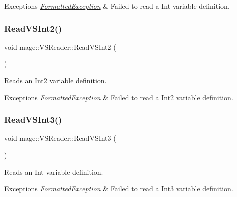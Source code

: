\begin{DoxyExceptions}{Exceptions}
{\em \hyperlink{structmage_1_1_formatted_exception}{Formatted\+Exception}} & Failed to read a Int variable definition. \\
\hline
\end{DoxyExceptions}
\hypertarget{classmage_1_1_v_s_reader_a4a3b90b47cb5e262a72df719674b9d93}{}\label{classmage_1_1_v_s_reader_a4a3b90b47cb5e262a72df719674b9d93} 
\subsubsection{\texorpdfstring{Read\+V\+S\+Int2()}{ReadVSInt2()}}
{\footnotesize\ttfamily void mage\+::\+V\+S\+Reader\+::\+Read\+V\+S\+Int2 (\begin{DoxyParamCaption}{ }\end{DoxyParamCaption})\hspace{0.3cm}{\ttfamily [private]}}

Reads an Int2 variable definition.


\begin{DoxyExceptions}{Exceptions}
{\em \hyperlink{structmage_1_1_formatted_exception}{Formatted\+Exception}} & Failed to read a Int2 variable definition. \\
\hline
\end{DoxyExceptions}
\hypertarget{classmage_1_1_v_s_reader_a6fa8fa2cbb66a9a1872bb84a0612a32d}{}\label{classmage_1_1_v_s_reader_a6fa8fa2cbb66a9a1872bb84a0612a32d} 
\subsubsection{\texorpdfstring{Read\+V\+S\+Int3()}{ReadVSInt3()}}
{\footnotesize\ttfamily void mage\+::\+V\+S\+Reader\+::\+Read\+V\+S\+Int3 (\begin{DoxyParamCaption}{ }\end{DoxyParamCaption})\hspace{0.3cm}{\ttfamily [private]}}

Reads an Int variable definition.


\begin{DoxyExceptions}{Exceptions}
{\em \hyperlink{structmage_1_1_formatted_exception}{Formatted\+Exception}} & Failed to read a Int3 variable definition. \\
\hline
\end{DoxyExceptions}
\hypertarget{classmage_1_1_v_s_reader_a8d00057f90b2a2ed2e84e47530f91227}{}\label{classmage_1_1_v_s_reader_a8d00057f90b2a2ed2e84e47530f91227} 
